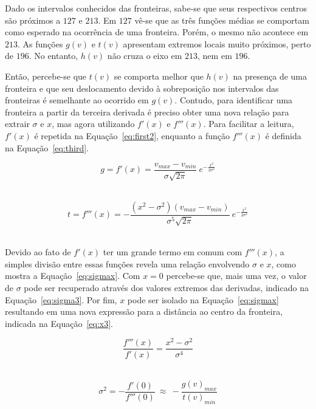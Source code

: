 	Dado os intervalos conhecidos das fronteiras, sabe-se que seus respectivos centros são próximos a $ 127 $ e $ 213 $. Em $ 127 $ vê-se que as três funções médias se comportam como esperado na ocorrência de uma fronteira. Porém, o mesmo não acontece em $ 213 $. As funções $ g(v) $ e $ t(v) $ apresentam extremos locais muito próximos, perto de $ 196 $. No entanto, $ h(v) $ não cruza o eixo em $ 213 $, nem em $ 196 $.
	
	Então, percebe-se que $ t(v) $ se comporta melhor que $ h(v) $ na presença de uma fronteira e que seu deslocamento devido à sobreposição nos intervalos das fronteiras é semelhante ao ocorrido em $ g(v) $. Contudo, para identificar uma fronteira a partir da terceira derivada é preciso obter uma nova relação para extrair $ \sigma $ e $ x $, mas agora utilizando $ f'(x) $ e $ f'''(x) $. Para facilitar a leitura, $ f'(x) $ é repetida na Equação~\eqref{eq:first2}, enquanto a função $ f'''(x) $ é definida na Equação~\eqref{eq:third}.
	
\begin{equation} \label{eq:first2}
g = f'(x) = \frac{v_{max} - v_{min}}{\sigma\sqrt{2\pi}}\ e^{-\frac{x^{2}}{2\sigma^{2}}}
\end{equation} \

\begin{equation} \label{eq:third}
t = f'''(x) = -\frac{(x^{2} - \sigma^{2})(v_{max} - v_{min})}{\sigma^{5}\sqrt{2\pi}}\ e^{-\frac{x^{2}}{2\sigma^{2}}}
\end{equation} \
	
	Devido ao fato de $ f'(x) $ ter um grande termo em comum com $ f'''(x) $, a simples divisão entre essas funções revela uma relação envolvendo $ \sigma $ e $ x $, como mostra a Equação~\eqref{eq:sigmax}. Com $ x = 0 $ percebe-se que, mais uma vez, o valor de $ \sigma $ pode ser recuperado através dos valores extremos das derivadas, indicado na Equação~\eqref{eq:sigma3}. Por fim, $ x $ pode ser isolado na Equação~\eqref{eq:sigmax} resultando em uma nova expressão para a distância ao centro da fronteira, indicada na Equação~\eqref{eq:x3}.

\begin{equation} \label{eq:sigmax}
	\frac{f'''(x)}{f'(x)} = \frac{x^{2} - \sigma^{2}}{\sigma^{4}}
\end{equation} \

\begin{equation} \label{eq:sigma3}
	\sigma^{2} = -\frac{f'(0)}{f'''(0)} \ \approx \ -\frac{g(v)_{max}}{t(v)_{min}}
\end{equation} \

